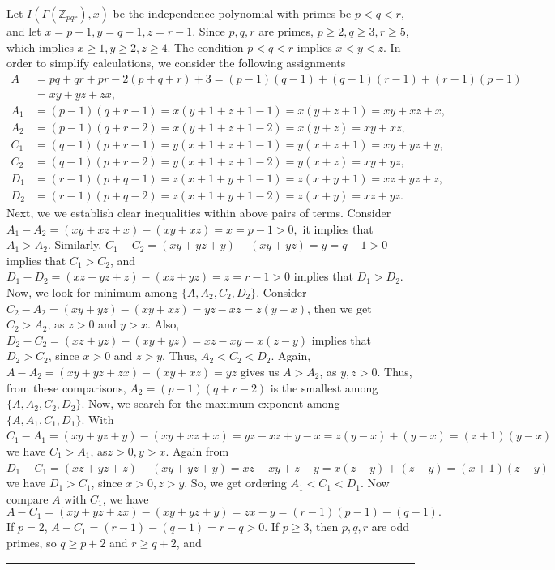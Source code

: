 \documentclass[12pt,twoside]{article}
\renewenvironment{proof}{{\noindent\bfseries Proof.}}{\qed}
\def\qed{\nolinebreak\hfill\rule{.2cm}{.2cm}\par\addvspace{.5cm}}
\begin{document}
\begin{proof} Let $I(\varGamma(\mathbb{Z}_{pqr}),x) $ be the independence polynomial with  primes be $p<q<r$, and let $x=p-1, y=q-1, z=r-1$. Since $p,q,r$ are primes, $p \ge 2, q \ge 3, r \ge 5$, which implies $x \ge 1, y \ge 2, z \ge 4$. The condition $p<q<r$ implies $x<y<z$. In order to simplify calculations, we consider the following assignments 
	\begin{align*}
	 A &= pq + qr + pr - 2(p + q + r) + 3 = (p-1)(q-1) + (q-1)(r-1) + (r-1)(p-1) \\
	 &= xy+yz+zx,\\
	 A_1 &= (p-1)(q+r-1) = x(y+1+z+1-1) = x(y+z+1) = xy+xz+x,\\
	 A_2 &= (p-1)(q+r-2) = x(y+1+z+1-2) = x(y+z) = xy+xz,\\
	 C_1 &= (q-1)(p+r-1) = y(x+1+z+1-1) = y(x+z+1) = xy+yz+y,\\
	 C_2 &= (q-1)(p+r-2) = y(x+1+z+1-2) = y(x+z) = xy+yz,\\
	 D_1 &= (r-1)(p+q-1) = z(x+1+y+1-1) = z(x+y+1) = xz+yz+z,\\
	 D_2 &= (r-1)(p+q-2) = z(x+1+y+1-2) = z(x+y) = xz+yz.
	\end{align*}
	Next, we we establish clear inequalities within above pairs of terms.  Consider $A_1 - A_2 = (xy+xz+x) - (xy+xz) = x = p-1 > 0, $ it implies that $ A_1 > A_2$. Similarly,  $C_1 - C_2 = (xy+yz+y) - (xy+yz) = y = q-1 > 0 $ implies that $C_1 > C_2$, and  $D_1 - D_2 = (xz+yz+z) - (xz+yz) = z = r-1 > 0 $ implies that $ D_1 > D_2$. Now, we look for minimum among  $\{A, A_2, C_2, D_2\}$.  Consider $C_2 - A_2 = (xy+yz) - (xy+xz) = yz-xz = z(y-x)$, then we get  $C_2 > A_2$, as  $z>0$ and $y>x$. Also, $D_2 - C_2 = (xz+yz) - (xy+yz) = xz-xy = x(z-y)$ implies that $D_2 > C_2$, since $x>0$ and $z>y$. Thus, $A_2 < C_2 < D_2$. Again, $A - A_2 = (xy+yz+zx) - (xy+xz) = yz$ gives us $A > A_2$, as $y,z>0$. Thus, from these comparisons, $A_2=(p-1)(q+r-2)$ is the smallest among $\{A, A_2, C_2, D_2\}$. Now, we search for the maximum exponent among $\{A, A_1, C_1, D_1\}$. With $C_1 - A_1 = (xy+yz+y) - (xy+xz+x) = yz-xz+y-x = z(y-x)+(y-x) = (z+1)(y-x)$ we have $C_1 > A_1$, as$z>0, y >x$. Again from
 	$D_1 - C_1 = (xz+yz+z) - (xy+yz+y) = xz-xy+z-y = x(z-y)+(z-y) = (x+1)(z-y)$ we have $D_1 > C_1$, since $x>0, z>y$. So, we get ordering $A_1 < C_1 < D_1$. Now compare $A$ with $C_1$, we have
	$$A - C_1 = (xy+yz+zx) - (xy+yz+y) = zx-y = (r-1)(p-1)-(q-1).$$
	If $p=2$, $A-C_1 = (r-1)-(q-1) = r-q > 0$.  If $p \ge 3$, then $p,q,r$ are odd primes, so $q \ge p+2$ and $r \ge q+2$, and 

\end{proof}
\end{document}
